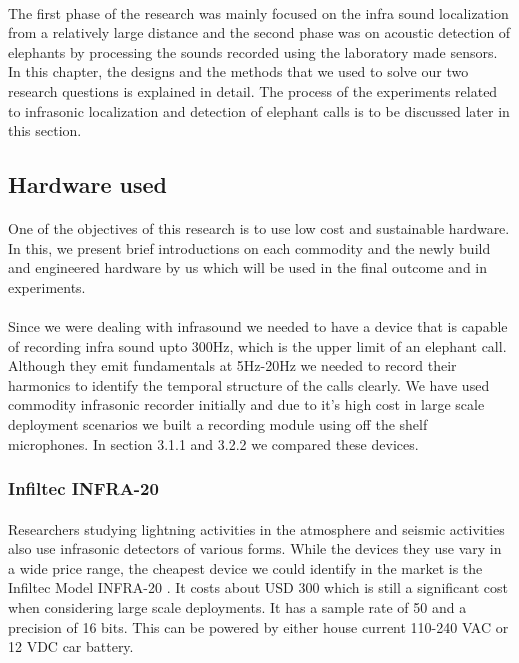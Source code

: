 \documentclass[12pt]{article}
\numberwithin{figure}{section}
\numberwithin{table}{section}
\begin{document}
\paragraph{}
The first phase of the research was mainly focused on the infra sound localization from a relatively large distance and the second phase was on acoustic detection of elephants by processing the sounds recorded using the laboratory made sensors. In this chapter, the designs and the methods that we used to solve our two research questions is explained in detail. The process of the experiments related to infrasonic localization and detection of elephant calls is to be discussed later in this section.

\subsection{Hardware used}

\paragraph{}
One of the objectives of this research is to use low cost and sustainable hardware. In this, we present brief introductions on each commodity and the newly build and engineered hardware by us which will be used in the final outcome and in experiments. 

\paragraph{}
Since we were dealing with infrasound we needed to have a device that is capable of recording infra sound upto 300Hz, which is the upper limit of an elephant call. Although they emit fundamentals at 5Hz-20Hz we needed to record their harmonics to identify the temporal structure of the calls clearly. We have used commodity infrasonic recorder initially and due to it's high cost in large scale deployment scenarios we built a recording module using off the shelf microphones. In section 3.1.1 and 3.2.2 we compared these devices. 

\subsubsection{Infiltec INFRA-20}  

\paragraph{}
Researchers studying lightning activities in the atmosphere and seismic activities also use infrasonic detectors of
various forms. While the devices they use vary in a wide price range, the cheapest device we could identify in the market
is the Infiltec Model INFRA-20 \cite{29}. It costs about USD 300 which is still a significant cost when considering large
scale deployments. It has a sample rate of 50 and a precision of 16 bits. This can be powered by either house current 110-240 VAC or 12 VDC car battery. \cite{29}
\end{document}
